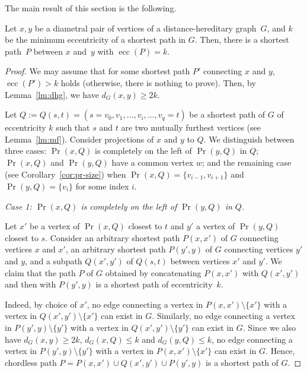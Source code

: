 \documentclass[10pt]{llncs}
\DeclareMathOperator{\ecc}{ecc}
\begin{document}
The main result of this section is the following.

\begin{theorem}
    \label{th:dhg} 
Let $x,y$ be a diametral pair of vertices of a distance-hereditary graph~$G$, and $k$ be the minimum eccentricity of a shortest path in $G$. 
Then, there is a shortest path~$P$ between $x$ and~$y$ with $\ecc(P) = k$.  
\end{theorem}

\begin{proof} 
We may assume that for some shortest path $P'$ connecting $x$ and $y$, $\ecc(P') > k$ holds (otherwise, there is nothing to prove).
Then, by Lemma~\ref{lm:dhg}, we have $d_G(x,y) \geq 2k$.

Let $Q := Q(s,t) = (s = v_0, v_1, \ldots, v_i, \ldots, v_q = t)$ be a shortest path of $G$ of eccentricity $k$ such that $s$ and $t$ are two mutually furthest vertices (see Lemma~\ref{lm:mf}). 
Consider projections of $x$ and $y$ to $Q$. 
We distinguish between three cases: 
$\Pr(x,Q)$ is completely on the left of $\Pr(y,Q)$ in $Q$; $\Pr(x,Q)$ and $\Pr(y,Q)$ have a common vertex $w$; and the remaining case (see Corollary~\ref{cor:pr-size}) when $\Pr(x,Q) = \{ v_{i-1}, v_{i+1} \}$ and $\Pr(y,Q) = \{ v_i \}$ for some index $i$.

\medskip

\noindent
\emph{Case 1: $\Pr(x,Q)$ is completely on the left of $\Pr(y,Q)$ in $Q$.}    

\medskip
\noindent
Let $x'$ be a vertex of $\Pr(x,Q)$ closest to $t$ and $y'$ a vertex of $\Pr(y,Q)$ closest to $s$. 
Consider an arbitrary shortest path $P(x,x')$ of $G$ connecting vertices $x$ and $x'$, an arbitrary shortest path $P(y',y)$ of $G$ connecting vertices $y'$ and $y$, and a subpath $Q(x',y')$ of $Q(s,t)$ between vertices $x'$ and $y'$. 
We claim that the path $P$ of $G$ obtained by concatenating $P(x,x')$ with $Q(x',y')$ and then with $P(y',y)$ is a shortest path of eccentricity~$k$. 

Indeed, by choice of $x'$, no edge connecting a vertex in $P(x,x') \setminus \{ x' \}$ with a vertex in $Q(x',y') \setminus \{ x' \}$ can exist in $G$. 
Similarly, no edge connecting a vertex in $P(y',y) \setminus \{ y' \}$ with a vertex in $Q(x',y') \setminus \{ y' \}$ can exist in $G$. 
Since we also have $d_G(x,y) \geq 2k$, $d_G(x,Q) \leq k$ and $d_G(y,Q) \leq k$, no edge connecting a vertex in  $P(y',y) \setminus \{ y' \}$ with a vertex in $P(x,x') \setminus \{ x' \}$ can exist in $G$. 
Hence, chordless path $P = P(x,x') \cup Q(x',y') \cup P(y',y)$ is a shortest path of $G$.


\end{proof}
\end{document}
